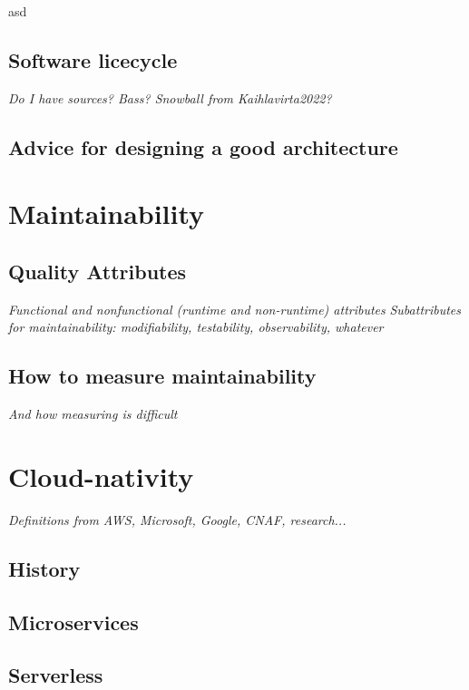 \documentclass[utf8,english]{gradu3}
\newcommand{\tmp}[1]{\textit{{#1}}}
\begin{document}
asd




\subsection{Software licecycle}
\tmp{Do I have sources? Bass? Snowball from Kaihlavirta2022?}

\subsection{Advice for designing a good architecture}



\section{Maintainability}

\subsection{Quality Attributes}

\tmp{Functional and nonfunctional (runtime and non-runtime) attributes}
\tmp{Subattributes for maintainability: modifiability, testability, observability, whatever}

\subsection{How to measure maintainability}

\tmp{And how measuring is difficult}

\section{Cloud-nativity}

\tmp{Definitions from AWS, Microsoft, Google, CNAF, research...}
\subsection{History}

\subsection{Microservices}

\subsection{Serverless}
\end{document}
